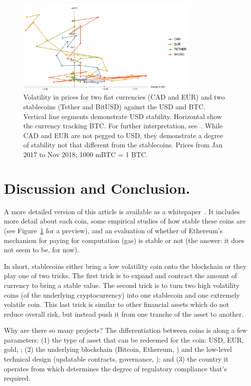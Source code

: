 
\begin{figure}[t]
	\centering
	\includegraphics[width=0.8\textwidth]{figures/newGraph.pdf}
	\caption{\label{fig:vol}
	Volatility in prices for two fiat currencies (CAD and EUR) and two stablecoins (Tether and BitUSD) against the USD and BTC.
	Vertical line segments demonstrate USD stability. 
	Horizontal show the currency tracking BTC.
	For further interpretation, see~\cite{CDM19}.
	While CAD and EUR are not pegged to USD, they demonstrate a degree of stability not that different from the stablecoins. 
	Prices from Jan 2017 to Nov 2018; 1000 mBTC = 1 BTC.}
\end{figure}

\section{Discussion and Conclusion.}

A more detailed version of this article is available as a whitepaper~\cite{CDM19}. It includes more detail about each coin, some empirical studies of how stable these coins are (see Figure~\ref{fig:vol} for a preview), and an evaluation of whether of Ethereum's mechanism for paying for computation (gas) is stable or not (the answer: it does not seem to be, for now).

In short, stablecoins either bring a low volatility coin onto the blockchain or they play one of two tricks. The first trick is to expand and contract the amount of currency to bring a stable value. The second trick is to turn two high volatility coins (\eg of the underlying cryptocurrency) into one stablecoin and one extremely volatile coin. This last trick is similar to other financial assets which do not reduce overall risk, but instead push it from one tranche of the asset to another.

Why are there so many projects? The differentiation between coins is along a few parameters: (1) the type of asset that can be redeemed for the coin: USD, EUR, gold, \etc; (2) the underlying blockchain (\eg Bitcoin, Ethereum, \etc) and the low-level technical design (updatable contracts, governance, \etc); and (3) the country it operates from which determines the degree of regulatory compliance that's required. 


